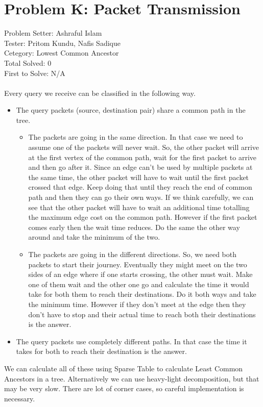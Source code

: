 \section*{Problem K: Packet Transmission}
Problem Setter: Ashraful Islam \\
Tester: Pritom Kundu, Nafis Sadique \\
Cetegory: Lowest Common Ancestor \\
Total Solved: 0 \\
First to Solve: N/A \\
\\
Every query we receive can be classified in the following way.
\begin{itemize}
    \item The query packets (source, destination pair) share a common path in the tree. 
    \begin{itemize}
        \item The packets are going in the same direction. In that case we need to assume one of the
        packets will never wait. So, the other packet will arrive at the first vertex of the common path,
        wait for the first packet to arrive and then go after it. Since an edge can't be used by
        multiple packets at the same time, the other packet will have to wait until the first packet 
        crossed that edge. Keep doing that until they reach the end of common path and then they can 
        go their own ways. If we think carefully, we can see that the other packet will have to wait
        an additional time totalling the maximum edge cost on the common path. However if the first
        packet comes early then the wait time reduces. Do the same the other way around and take
        the minimum of the two.
        \item The packets are going in the different directions. So, we need both packets to start
        their journey. Eventually they might meet on the two sides of an edge where if one starts crossing,
        the other must wait. Make one of them wait and the other one go and calculate the time it would 
        take for both them to reach their destinations. Do it both ways and take the minimum time. However if
        they don't meet at the edge then they don't have to stop and their actual time to reach both 
        their destinations is the answer. 
    \end{itemize}
    \item The query packets use completely different paths. In that case the time it takes for both to reach
    their destination is the answer.
\end{itemize}
We can calculate all of these using Sparse Table to calculate Least Common Ancestors in a tree. Alternatively 
we can use heavy-light decomposition, but that may be very slow. There are lot of corner cases, so careful 
implementation is necessary.
